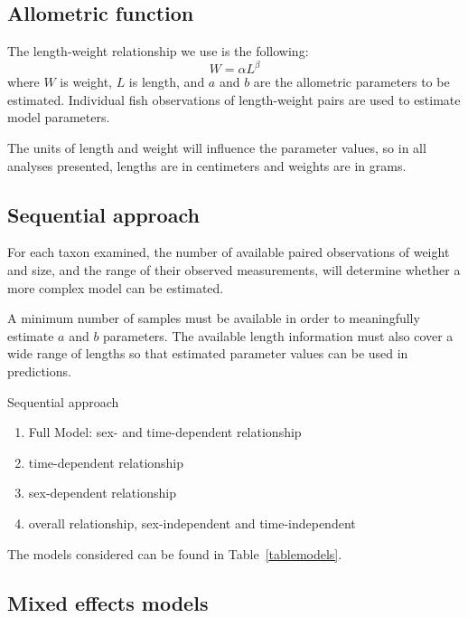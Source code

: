 \documentclass[12pt]{article}\usepackage[]{graphicx}\usepackage[]{color}
\begin{document}
\subsection{Allometric function}\label{allometric-function}

The length-weight relationship we use is the following: \begin{equation}
W = \alpha L^{\beta}
\end{equation} where \(W\) is weight, \(L\) is length, and \(a\) and \(b\) are the allometric parameters to be estimated.
Individual fish observations of length-weight pairs are used to estimate model parameters.

The units of length and weight will influence the parameter values, so in all analyses presented, lengths are in centimeters and weights are in grams.

\subsection{Sequential approach}\label{sequential-approach}

For each taxon examined, the number of available paired observations of weight and size, and the range of their observed measurements, will determine whether a more complex model can be estimated.

A minimum number of samples must be available in order to meaningfully estimate \(a\) and \(b\) parameters. The available length information must also cover a wide range of lengths so that estimated parameter values can be used in predictions.

Sequential approach
\begin{enumerate}
\def\labelenumi{\arabic{enumi}.}

\item
  Full Model: sex- and time-dependent relationship
\item
  time-dependent relationship
\item
  sex-dependent relationship
\item
  overall relationship, sex-independent and time-independent
\end{enumerate}
The models considered can be found in Table~\ref{tablemodels}.

\subsection{Mixed effects models}\label{mixed-effects-models}
\end{document}
